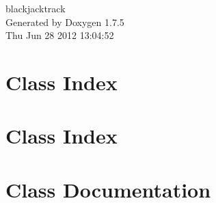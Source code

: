 \documentclass[a4paper]{book}
\begin{document}
\hypersetup{pageanchor=false,citecolor=blue}
\begin{titlepage}
\vspace*{7cm}
\begin{center}
{\Large blackjacktrack }\\
\vspace*{1cm}
{\large \-Generated by Doxygen 1.7.5}\\
\vspace*{0.5cm}
{\small Thu Jun 28 2012 13:04:52}\\
\end{center}
\end{titlepage}
\clearemptydoublepage
{}
\tableofcontents
\clearemptydoublepage
{}
\hypersetup{pageanchor=true,citecolor=blue}
\chapter{\-Class \-Index}

\chapter{\-Class \-Index}

\chapter{\-Class \-Documentation}




































\printindex
\end{document}
